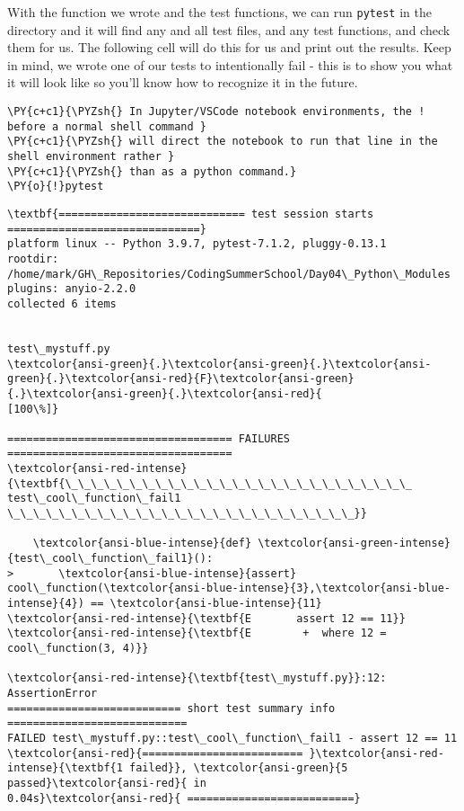     With the function we wrote and the test functions, we can run
\texttt{pytest} in the directory and it will find any and all test
files, and any test functions, and check them for us. The following cell
will do this for us and print out the results. Keep in mind, we wrote
one of our tests to intentionally fail - this is to show you what it
will look like so you'll know how to recognize it in the future.

    \begin{tcolorbox}[breakable, size=fbox, boxrule=1pt, pad at break*=1mm,colback=cellbackground, colframe=cellborder]
\begin{Verbatim}[commandchars=\\\{\}]
\PY{c+c1}{\PYZsh{} In Jupyter/VSCode notebook environments, the ! before a normal shell command }
\PY{c+c1}{\PYZsh{} will direct the notebook to run that line in the shell environment rather }
\PY{c+c1}{\PYZsh{} than as a python command.}
\PY{o}{!}pytest 
\end{Verbatim}
\end{tcolorbox}

    \begin{Verbatim}[commandchars=\\\{\}]
\textbf{============================= test session starts
==============================}
platform linux -- Python 3.9.7, pytest-7.1.2, pluggy-0.13.1
rootdir: /home/mark/GH\_Repositories/CodingSummerSchool/Day04\_Python\_Modules
plugins: anyio-2.2.0
collected 6 items


test\_mystuff.py
\textcolor{ansi-green}{.}\textcolor{ansi-green}{.}\textcolor{ansi-green}{.}\textcolor{ansi-red}{F}\textcolor{ansi-green}{.}\textcolor{ansi-green}{.}\textcolor{ansi-red}{
[100\%]}

=================================== FAILURES ===================================
\textcolor{ansi-red-intense}{\textbf{\_\_\_\_\_\_\_\_\_\_\_\_\_\_\_\_\_\_\_\_\_\_\_\_\_\_\_ test\_cool\_function\_fail1
\_\_\_\_\_\_\_\_\_\_\_\_\_\_\_\_\_\_\_\_\_\_\_\_\_\_\_}}

    \textcolor{ansi-blue-intense}{def} \textcolor{ansi-green-intense}{test\_cool\_function\_fail1}():
>       \textcolor{ansi-blue-intense}{assert}
cool\_function(\textcolor{ansi-blue-intense}{3},\textcolor{ansi-blue-intense}{4}) == \textcolor{ansi-blue-intense}{11}
\textcolor{ansi-red-intense}{\textbf{E       assert 12 == 11}}
\textcolor{ansi-red-intense}{\textbf{E        +  where 12 = cool\_function(3, 4)}}

\textcolor{ansi-red-intense}{\textbf{test\_mystuff.py}}:12: AssertionError
=========================== short test summary info ============================
FAILED test\_mystuff.py::test\_cool\_function\_fail1 - assert 12 == 11
\textcolor{ansi-red}{========================= }\textcolor{ansi-red-intense}{\textbf{1 failed}}, \textcolor{ansi-green}{5 passed}\textcolor{ansi-red}{ in
0.04s}\textcolor{ansi-red}{ ==========================}
    \end{Verbatim}

